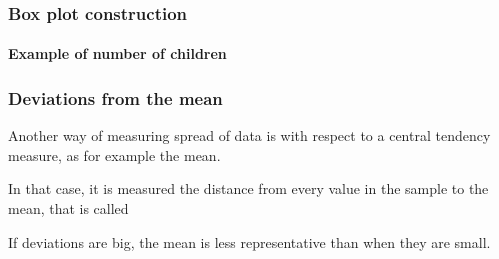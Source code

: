 \begin{frame}
\frametitle{Box plot construction}
\framesubtitle{Example of number of children}
\begin{enumerate}
 
 
\end{enumerate}
\begin{center}
\scalebox{0.45}{}
\end{center}
\end{frame}


\begin{frame}
\frametitle{Deviations from the mean}
Another way of measuring spread of data is with respect to a central tendency measure, as for example the mean. 

In that case, it is measured the distance from every value in the sample to the mean, that is called

\begin{center}
\scalebox{1}{}
\end{center}

If deviations are big, the mean is less representative than when they are small.
\end{frame}



